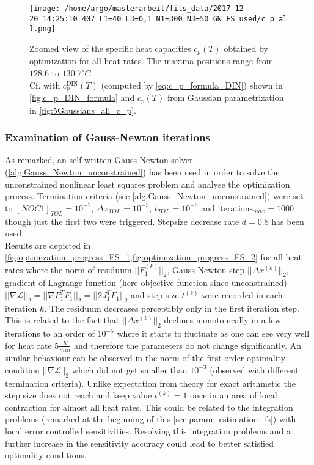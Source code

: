 \documentclass{scrartcl}[12pt, halfparskip]
\numberwithin{equation}{section}
\numberwithin{figure}{section}
\numberwithin{table}{section}
\begin{document}
\begin{figure}[H]
	\centering
	\texttt{[image: /home/argo/masterarbeit/fits\_data/2017-12-20\_14:25:10\_407\_L1=40\_L3=0,1\_N1=300\_N3=50\_GN\_FS\_used/c\_p\_all.png]}
	\caption{Zoomed view of the specific heat capacities $c_p(T)$ obtained by optimization for all heat rates. The maxima positions range from $128.6$ to $130.7^{\circ}C$. \\
	Cf. with $c_p^{\text{DIN}}(T)$ (computed by \cref{eq:c_p_formula_DIN}) shown in \cref{fig:c_p_DIN_formula} and $c_p(T)$ from Gaussian parametrization in \cref{fig:5Gaussians_all_c_p}.}
	\label{fig:FS_all_c_p}
\end{figure}

\subsubsection{Examination of Gauss-Newton iterations}
\label{sec:param_estimation_fs_examin_GN}

As remarked, an self written Gauss-Newton solver (\cref{alg:Gauss_Newton_unconstrained}) has been used in order to solve the unconstrained nonlinear least squares problem and analyse the optimization process. Termination criteria (see \cref{alg:Gauss_Newton_unconstrained}) were set to $[NOC1]_{TOL}=10^{-2}$, $\Delta x_{TOL}=10^{-5}$, $t_{TOL}=10^{-6}$ and iterations$_{max}=1000$ though just the first two were triggered. Stepsize decrease rate $d=0.8$ has been used. \\
Results are depicted in \cref{fig:optimization_progress_FS_1,fig:optimization_progress_FS_2} for all heat rates where the norm of residuum $||F_1^{(k)}||_2$, Gauss-Newton step $||\Delta x^{(k)}||_2$, gradient of Lagrange function (here objective function since unconstrained) $|| \nabla \mathcal{L} ||_2 = || \nabla F_1^T F_1 ||_2 = || 2 J_1^T F_1 ||_2$ and step size $t^{(k)}$ were recorded in each iteration $k$. The residuum decreases perceptibly only in the first iteration step. This is related to the fact that $||\Delta x^{(k)}||_2$ declines monotonically in a few iterations to an order of $10^{-5}$ where it starts to fluctuate as one can see very well for heat rate $5 \frac{K}{min}$ and therefore the parameters do not change significantly. 
An similar behaviour can be observed in the norm of the first order optimality condition  $|| \nabla \mathcal{L} ||_2$ which did not get smaller than $10^{-3}$ (observed with different termination criteria).
Unlike expectation from theory for exact arithmetic the step size does not reach and keep value $t^{(k)}=1$ once in an area of local contraction for almost all heat rates. 
This could be related to the integration problems (remarked at the beginning of this \cref{sec:param_estimation_fs}) with local error controlled sensitivities. Resolving this integration problems and a further increase in the sensitivity accuracy could lead to better satisfied optimality conditions.
\end{document}
